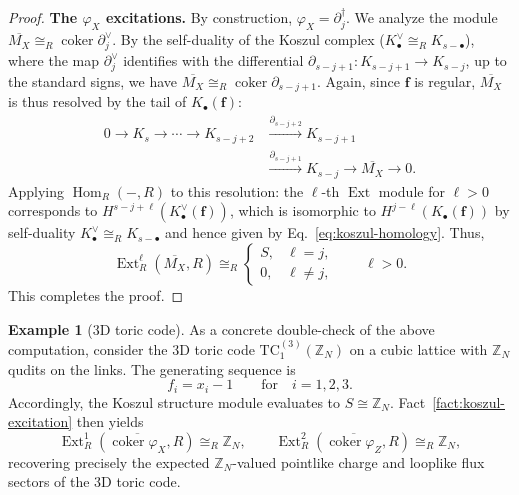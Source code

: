 \documentclass[aps,prx,english,superscriptaddress,twocolumn,tightenlines,showpacs,longbibliography,floatfix,amsfonts]{revtex4-2}
\theoremstyle{remark}
\theoremstyle{definition}
\newtheorem{example}{Example}
\begin{document}
\begin{proof}
	\textbf{The $\varphi_X$ excitations.}
	By construction, $\varphi_X = \partial_j^\dagger$. We analyze the module
	$\overline{M_X}
	\cong_R\operatorname{coker}\partial_j^\vee$.
	By the self-duality of the Koszul complex ($K_\bullet^\vee \cong_R K_{s-\bullet}$), where the map $\partial_j^\vee$ identifies with the differential $\partial_{s-j+1} : K_{s-j+1} \to K_{s-j}$, up to the standard signs, we have $\overline{M_X} \cong_R \operatorname{coker} \partial_{s-j+1}$. Again, since $\mathbf{f}$ is regular,
	$\overline{M_X}$ is thus resolved by the tail of $K_\bullet(\mathbf{f})$:
	\[
	\begin{aligned}
	0\longrightarrow K_s\longrightarrow\cdots\longrightarrow K_{s-j+2}
	&\xrightarrow{\partial_{s-j+2}}K_{s-j+1}\\
	&\xrightarrow{\partial_{s-j+1}}K_{s-j}
	\longrightarrow\overline{M_X}\longrightarrow0.
	\end{aligned}
	\]
	Applying $\operatorname{Hom}_R(-, R)$ to this resolution: the $\ell$-th $\operatorname{Ext}$ module for $\ell>0$ corresponds to $H^{s-j+\ell}(K_\bullet^\vee(\mathbf{f}))$, which is isomorphic to $H^{j-\ell}(K_\bullet(\mathbf{f}))$
	by self-duality $K_\bullet^\vee \cong_R K_{s-\bullet}$ and hence given by Eq.~\eqref{eq:koszul-homology}. Thus,
	\begin{equation}
		\operatorname{Ext}_R^\ell\!\left(\overline{M_X},R\right)
		\cong_R
		\begin{cases}
			S, & \ell =j,\\
			0, & \ell \neq j,
		\end{cases}
		\qquad \ell >0.
	\end{equation}
	This completes the proof.
\end{proof}

\begin{example}[3D toric code]
	As a concrete double-check of the above computation, consider the 3D toric code $\mathrm{TC}_1^{(3)}(\mathbb{Z}_N)$ on a cubic lattice with $\mathbb{Z}_N$ qudits on the links. The generating sequence is
	\begin{equation}
		f_i = x_i - 1 \qquad \text{for} \quad i=1,2,3.
	\end{equation}
	Accordingly, the Koszul structure module evaluates to $S \cong \mathbb{Z}_N$. Fact~\ref{fact:koszul-excitation} then yields
	\begin{equation}
		\operatorname{Ext}_R^1(\overline{\operatorname{coker}\varphi_X}, R) \cong_R \mathbb{Z}_N,
		\qquad
		\operatorname{Ext}_R^2(\overline{\operatorname{coker}\varphi_Z}, R) \cong_R \mathbb{Z}_N,
	\end{equation}
	recovering precisely the expected $\mathbb{Z}_N$-valued pointlike charge and looplike flux sectors of the 3D toric code.
\end{example}
\end{document}
